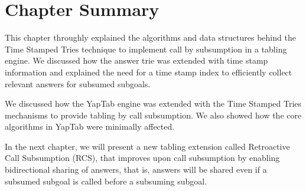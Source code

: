 \section{Chapter Summary}

This chapter throughly explained the algorithms and data structures behind the Time Stamped Tries
technique to implement call by subsumption in a tabling engine. We discussed how the answer trie
was extended with time stamp information and explained the need for a time stamp index to efficiently
collect relevant answers for subsumed subgoals.

We discussed how the YapTab engine was extended with the Time Stamped Tries mechanisms to
provide tabling by call subsumption. We also showed how the core algorithms in YapTab were minimally
affected.

In the next chapter, we will present a new tabling extension called Retroactive Call Subsumption (RCS),
that improves upon call subsumption by enabling bidirectional sharing of answers, that is, answers will
be shared even if a subsumed subgoal is called before a subsuming subgoal.

